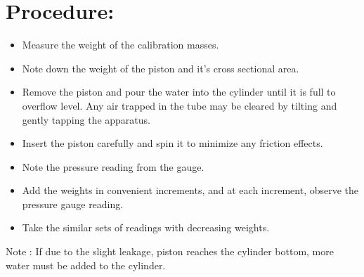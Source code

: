 \documentclass[12pt,a4paper]{article}
\begin{document}
\section{Procedure:}
\begin{itemize}
\item Measure the weight of the calibration masses. 
\item Note down the weight of the piston and it’s cross sectional area.
\item Remove the piston and pour the water into the cylinder until it is full to overflow level. Any air trapped in the tube may be cleared by tilting and gently tapping the apparatus. 
\item Insert the piston carefully and spin it to minimize any friction effects. 
\item Note the pressure reading from the gauge. 
\item Add the weights in convenient increments, and at each increment, observe the pressure gauge reading. 
\item Take the similar sets of readings with decreasing weights. 
\end{itemize}
Note : If due to the slight leakage, piston reaches the cylinder bottom, more water must be added to the cylinder.
\end{document}

